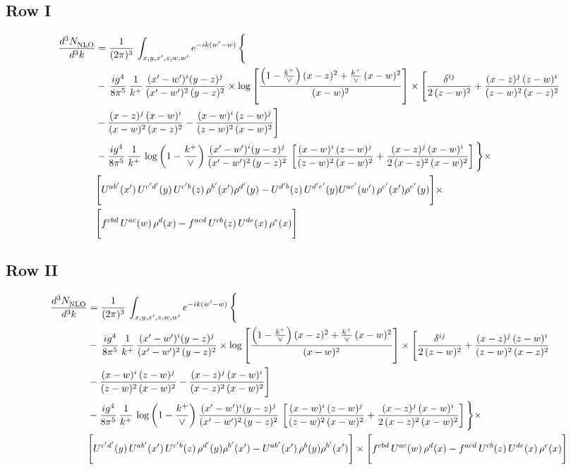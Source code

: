 \documentclass[9pt]{article}
\numberwithin{equation}{section}
\begin{document}
\subsection{Row I}
\begin{align}
     \frac{d^{3}N_{\rm NLO}^{\rm}}{d^{3}k}  & =   \frac{1}{(2\pi)^{3}}\, \int_{x,y,x',z,w,w^{\prime}} e^{-ik(w^{\prime}-w)}\, \Bigg\{\notag \\
& -\,\frac{ig^{4}}{8\pi^{5}}\,\frac{1}{k^{+}}\,\frac{(x'-w')^{i}(y-z)^{j}}{(x'-w')^{2}\,(y-z)^{2}}\times \log{\left[\frac{\left(1-\frac{k^{+}}{\vee}\right)(x-z)^{2}+\frac{k^{+}}{\vee}\,(x-w)^{2}}{(x-w)^{2}}\right]}\times \Bigg[\frac{\delta^{ij}}{2\,(z-w)^{2}}+\frac{(x-z)^{j}\,(z-w)^{i}}{(z-w)^{2}\,(x-z)^{2}}\notag \\ & -\frac{(x-z)^{j}\,(x-w)^{i}}{(x-w)^{2}\,(x-z)^{2}}-\frac{(x-w)^{i}\,(z-w)^{j}}{(z-w)^{2}\,(x-w)^{2}}\Bigg] \notag \\
& -\frac{ig^{4}}{8\pi^{5}}\,\frac{1}{k^{+}}\,\log{\left(1-\frac{k^{+}}{\vee}\right)}\,\frac{(x'-w')^{i}(y-z)^{j}}{(x'-w')^{2}\,(y-z)^{2}}\,\left[\frac{(x-w)^{i}\,(z-w)^{j}}{(z-w)^{2}\,(x-w)^{2}}+\frac{(x-z)^{j}\,(x-w)^{i}}{2\,(x-z)^{2}\, (x-w)^{2}}\right]\Bigg\}\times \notag \\ &  \Bigg[U^{ab'}(x')\,U^{c'd'}(y)\,U^{c'b}(z)\,\rho^{b'}(x')\rho^{d'}(y)-U^{d'b}(z)\,U^{d'e'}(y)U^{ac'}(w')\,\rho^{c'}(x')\rho^{e'}(y)\Bigg]\times\notag \\ & \Bigg[f^{cbd}\,U^{ac}(w)\,\rho^{d}(x)-f^{acd}\, U^{cb}(z)\,U^{de}(x)\,\rho^{e}(x)\Bigg]
\end{align}
\subsection{Row II}
\begin{align}
     \frac{d^{3}N_{\rm NLO}^{\rm}}{d^{3}k}  & =   \frac{1}{(2\pi)^{3}}\, \int_{x,y,x',z,w,w^{\prime}} e^{-ik(w^{\prime}-w)}\, \Bigg\{\notag \\
& -\,\frac{ig^{4}}{8\pi^{5}}\,\frac{1}{k^{+}}\,\frac{(x'-w')^{i}(y-z)^{j}}{(x'-w')^{2}\,(y-z)^{2}}\times \log{\left[\frac{\left(1-\frac{k^{+}}{\vee}\right)(x-z)^{2}+\frac{k^{+}}{\vee}\,(x-w)^{2}}{(x-w)^{2}}\right]}\times \Bigg[\frac{\delta^{ij}}{2\,(z-w)^{2}}+\frac{(x-z)^{j}\,(z-w)^{i}}{(z-w)^{2}\,(x-z)^{2}}\notag \\ & -\frac{(x-w)^{i}\,(z-w)^{j}}{(z-w)^{2}\,(x-w)^{2}}-\frac{(x-z)^{j}\,(x-w)^{i}}{(x-z)^{2}\,(x-w)^{2}}\Bigg] \notag \\
& -\frac{ig^{4}}{8\pi^{5}}\,\frac{1}{k^{+}}\,\log{\left(1-\frac{k^{+}}{\vee}\right)}\,\frac{(x'-w')^{i}(y-z)^{j}}{(x'-w')^{2}\,(y-z)^{2}}\,\left[\frac{(x-w)^{i}\,(z-w)^{j}}{(z-w)^{2}\,(x-w)^{2}}+\frac{(x-z)^{j}\,(x-w)^{i}}{2\,(x-z)^{2}\, (x-w)^{2}}\right]\Bigg\}\times \notag \\ & \Bigg[U^{c'd'}(y)\,U^{ab'}(x')\,U^{c'b}(z)\,\rho^{d'}(y)\rho^{b'}(x')-U^{ab'}(x')\,\rho^{b}(y)\rho^{b'}(x')\Bigg]\times\Bigg[f^{cbd}\,U^{ac}(w)\,\rho^{d}(x)-f^{acd}\, U^{cb}(z)\,U^{de}(x)\,\rho^{e}(x)\Bigg]
\end{align}
\end{document}
